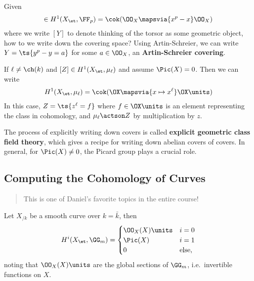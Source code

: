 \begin{example}[?]

Given
\begin{align*}
[Y] \in H^1(X_\et, \FF_p) = \cok(\OO_X\mapsvia{x^p-x} \OO_X)
\end{align*} where we write \([Y]\) to denote thinking of the torsor as
some geometric object, how to we write down the covering space? Using
Artin-Schreier, we can write \(Y = \ts{y^p - y = a}\) for some
\(a\in \OO_X\), an \textbf{Artin-Schreier covering}.

If \(\ell \neq \ch(k)\) and \([Z] \in H^1(X_\et, \mu_\ell)\) and assume
\(\Pic(X) = 0\). Then we can write
\begin{align*}
H^1(X_\et, \mu_\ell) = \cok(\OX \mapsvia{x\mapsto x^\ell} \OX\units)
\end{align*} In this case, \(Z = \ts{z^\ell = f}\) where
\(f\in \OX\units\) is an element representing the class in cohomology,
and \(\mu_\ell \actson Z\) by multiplication by \(z\).

\end{example}

\begin{remark}

The process of explicitly writing down covers is called \textbf{explicit
geometric class field theory}, which gives a recipe for writing down
abelian covers of covers. In general, for \(\Pic(X) \neq 0\), the Picard
group plays a crucial role.

\end{remark}

\hypertarget{computing-the-cohomology-of-curves}{%
\subsection{Computing the Cohomology of
Curves}\label{computing-the-cohomology-of-curves}}

\begin{quote}
This is one of Daniel's favorite topics in the entire course!
\end{quote}

\begin{theorem}[?]

Let \(X_{/k}\) be a smooth curve over \(k=\bar k\), then
\begin{align*}  
H^i(X_\et, \GG_m) 
=
\begin{cases}
\OO_X(X)\units & i = 0\\
\Pic(X) & i=1 \\
0 & \text{else},
\end{cases}
\end{align*} noting that \(\OO_X(X)\units\) are the global sections of
\(\GG_m\), i.e.~invertible functions on \(X\).

\end{theorem}

